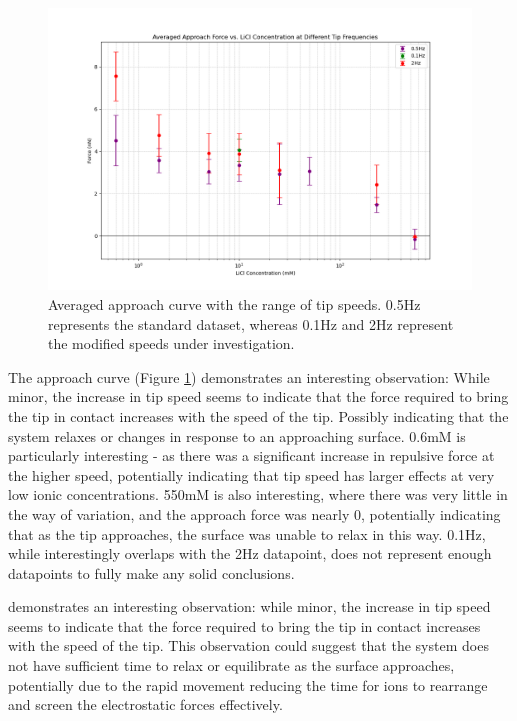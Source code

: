 \begin{figure}[h!]
\centering
\includegraphics[width=\textwidth]{chapter7/Tip speed/Overall graph approach.png}
\caption{Averaged approach curve with the range of tip speeds. 0.5Hz represents the standard dataset, whereas 0.1Hz and 2Hz represent the modified speeds under investigation.}
\label{fig:ApproachAverageSpeed}
\end{figure}

The approach curve (Figure \ref{fig:ApproachAverageSpeed}) demonstrates an interesting observation: While minor, the increase in tip speed seems to indicate that the force required to bring the tip in contact increases with the speed of the tip. Possibly indicating that the system relaxes or changes in response to an approaching surface. 0.6mM is particularly interesting - as there was a significant increase in repulsive force at the higher speed, potentially indicating that tip speed has larger effects at very low ionic concentrations. 550mM is also interesting, where there was very little in the way of variation, and the approach force was nearly 0, potentially indicating that as the tip approaches, the surface was unable to relax in this way. 0.1Hz, while interestingly overlaps with the 2Hz datapoint, does not represent enough datapoints to fully make any solid conclusions. 

demonstrates an interesting observation: while minor, the increase in tip speed seems to indicate that the force required to bring the tip in contact increases with the speed of the tip. This observation could suggest that the system does not have sufficient time to relax or equilibrate as the surface approaches, potentially due to the rapid movement reducing the time for ions to rearrange and screen the electrostatic forces effectively.

